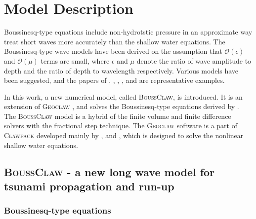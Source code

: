 \documentclass[review]{elsarticle}
\newcommand{\BoussClaw}{\textsc{BoussClaw} }
\newcommand{\BoussClawt}{\textsc{BoussClaw}}
\begin{document}
\section{Model Description}
\label{sec:model}

Boussinesq-type equations include non-hydrotstic pressure in an approximate way
treat short waves more accurately
than the shallow water equations. 
The Boussinesq-type wave models have been derived 
on the assumption that 
$\mathcal{O}(\epsilon)$ and $\mathcal{O}(\mu)$ terms
are small, where $\epsilon$ and $\mu$ 
denote the ratio of wave amplitude to depth
and the ratio of depth to wavelength respectively. 
Various models have been suggested,
and the papers of \citet{peregrine1967long},
\citet{madsen1992new}, \citet{nwogu1993alternative},
\citet{lynett2002modeling},
and \citet{wei1995time}
are representative examples. 

In this work, a new numerical model, 
called \BoussClawt, is introduced. 
It is an extension of \textsc{Geoclaw} \citep{clawpack},
and solves 
the Boussinesq-type equations derived by
\citet{schaffer1993boussinesq}.
The \BoussClaw model
is a hybrid of the finite volume and finite difference solvers
with the fractional step technique.
The \textsc{Geoclaw} software is 
a part of \textsc{Clawpack} \citep{clawpack}
developed mainly by
\citet{leveque1997wave}, \citet{george2008augmented}
and \citet{BergerGeorgeLeVequeMandli11},
which is designed to solve the nonlinear shallow water equations.

\subsection{\BoussClaw - a new long wave model for tsunami propagation and run-up}

\subsubsection{Boussinesq-type equations}
\end{document}
